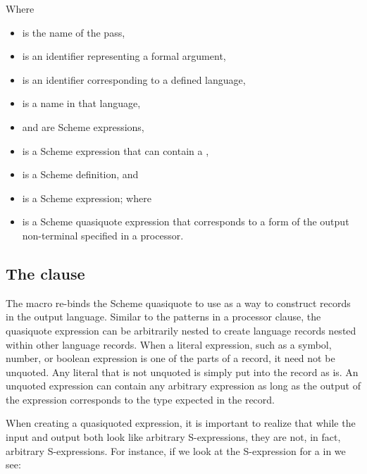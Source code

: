 \documentclass[letterpaper,10pt]{article}
\begin{document}
\noindent
Where 
\begin{itemize}
\item {} is the name of the pass,
\item {} is an identifier representing a formal argument,
\item {} is an identifier corresponding to a defined language,
\item {} is a name in that language,
\item {} and  are Scheme expressions,
\item {} is a Scheme expression that can contain a
, 
\item {} is a Scheme definition, and
\item {} is a Scheme expression; where
\item {} is a Scheme quasiquote expression that corresponds
to a form of the output non-terminal specified in a processor.
\end{itemize}

\begin{schemeregion}
\newsavebox{\qq}
\subsection{The \qq clause}
\qq
\end{schemeregion}

The  macro re-binds the Scheme quasiquote to use as a way
to construct records in the output language.
Similar to the patterns in a processor clause, the quasiquote expression can be
arbitrarily nested to create language records nested within other language
records.
When a literal expression, such as a symbol, number, or boolean expression is
one of the parts of a record, it need not be unquoted.
Any literal that is not unquoted is simply put into the record as is.
An unquoted expression can contain any arbitrary expression as long as the
output of the expression corresponds to the type expected in the record.

When creating a quasiquoted expression, it is important to realize that while
the input and output both look like arbitrary S-expressions, they are not, in
fact, arbitrary S-expressions.
For instance, if we look at the S-expression for a  in 
we see:
\end{document}
